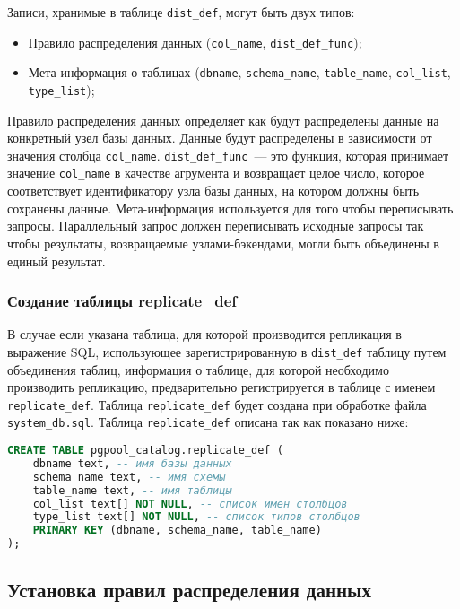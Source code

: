 Записи, хранимые в таблице \lstinline!dist_def!, могут быть двух типов:

\begin{itemize}
  \item Правило распределения данных (\lstinline!col_name!, \lstinline!dist_def_func!);
  \item Мета-информация о таблицах (\lstinline!dbname!, \lstinline!schema_name!, \lstinline!table_name!, \lstinline!col_list!, \lstinline!type_list!);
\end{itemize}

Правило распределения данных определяет как будут распределены данные на конкретный узел базы данных. Данные будут распределены в зависимости от значения столбца \lstinline!col_name!. \lstinline!dist_def_func!~--- это функция, которая принимает значение \lstinline!col_name! в качестве агрумента и возвращает целое число, которое соответствует идентификатору узла базы данных, на котором должны быть сохранены данные. Мета-информация используется для того чтобы переписывать запросы. Параллельный запрос должен переписывать исходные запросы так чтобы результаты, возвращаемые узлами-бэкендами, могли быть объединены в единый результат.


\subsubsection{Создание таблицы replicate\_def}

В случае если указана таблица, для которой производится репликация в выражение SQL, использующее зарегистрированную в \lstinline!dist_def! таблицу путем объединения таблиц, информация о таблице, для которой необходимо производить репликацию, предварительно регистрируется в таблице с именем \lstinline!replicate_def!. Таблица \lstinline!replicate_def! будет создана при обработке файла \lstinline!system_db.sql!. Таблица \lstinline!replicate_def! описана так как показано ниже:

\begin{lstlisting}[language=SQL,label=lst:pgpool31:1,caption=Создание таблицы replicate\_def]
CREATE TABLE pgpool_catalog.replicate_def (
    dbname text, -- имя базы данных
    schema_name text, -- имя схемы
    table_name text, -- имя таблицы
    col_list text[] NOT NULL, -- список имен столбцов
    type_list text[] NOT NULL, -- список типов столбцов
    PRIMARY KEY (dbname, schema_name, table_name)
);
\end{lstlisting}


\subsection{Установка правил распределения данных}

